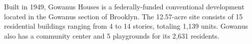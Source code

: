 Built in 1949, Gowanus Houses is a federally-funded conventional development located in the Gowanus section of Brooklyn. The 12.57-acre site consists of 15 residential buildings ranging from 4 to 14 stories, totaling 1,139 units. Gowanus also has a community center and 5 playgrounds for its 2,631 residents.